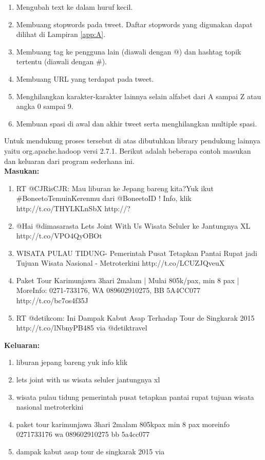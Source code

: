 \begin{enumerate}
	\item Mengubah text ke dalam huruf kecil.
	\item Membuang stopwords pada tweet. Daftar stopwords yang digunakan dapat dilihat di Lampiran \ref{app:A}.
	\item Membuang tag ke pengguna lain (diawali dengan @) dan hashtag topik tertentu (diawali dengan \#).
	\item Membuang URL yang terdapat pada tweet.
	\item Menghilangkan karakter-karakter lainnya selain alfabet dari A sampai Z atau angka 0 sampai 9.
	\item Membuan spasi di awal dan akhir tweet serta menghilangkan multiple spasi.
\end{enumerate}
 
Untuk mendukung proses tersebut di atas dibutuhkan library pendukung lainnya yaitu org.apache.hadoop versi 2.7.1. Berikut adalah beberapa contoh masukan dan keluaran dari program sederhana ini.\\
 
     
\textbf{Masukan:}
\begin{enumerate}
	\item RT @CJRisCJR: Mau liburan ke Jepang bareng kita?Yuk ikut \#BoneetoTemuinKerenmu dari @BoneetoID ! Info, klik  http://t.co/THYLKLnSbX http://?
	\item @Hai @dimasarasta  Lets Joint With Us Wisata Seluler ke Jantungnya XL http://t.co/VPO4QyOBOt
	\item WISATA PULAU TIDUNG- Pemerintah Pusat Tetapkan Pantai Rupat jadi Tujuan Wisata Nasional - Metroterkini  http://t.co/LCUZJQveuX
	\item Paket Tour Karimunjawa 3hari 2malam | Mulai 805k/pax, min 8 pax | MoreInfo: 0271-733176, WA 089602910275, BB 5A4CC077 http://t.co/bc7os4f35J
	\item RT @detikcom: Ini Dampak Kabut Asap Terhadap Tour de Singkarak 2015 http://t.co/lNbnyPB485  via @detiktravel
\end{enumerate} 
     
\textbf{Keluaran:}
\begin{enumerate}
	\item liburan jepang bareng yuk info klik 
	\item lets joint with us wisata seluler jantungnya xl
	\item wisata pulau tidung pemerintah pusat tetapkan pantai rupat tujuan wisata nasional metroterkini
	\item paket tour karimunjawa 3hari 2malam 805kpax min 8 pax moreinfo 0271733176 wa 089602910275 bb 5a4cc077
	\item dampak kabut asap tour de singkarak 2015 via
\end{enumerate}

